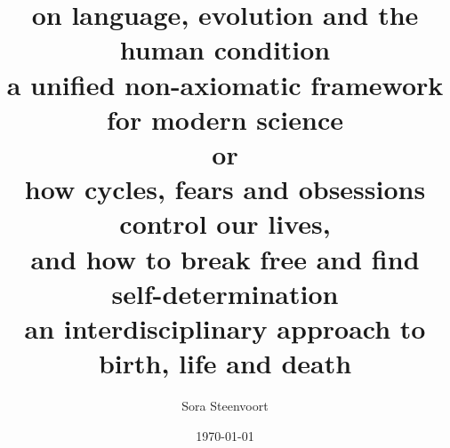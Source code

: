 \documentclass[12pt]{report}
\title{
{on language, evolution and the human condition}\\
{\large a unified non-axiomatic framework for modern science}\\
{\large\sc or}\\
{how cycles, fears and obsessions control our lives,\\and how to break free and find self-determination}\\
{\large an interdisciplinary approach to birth, life and death}
}
\author{Sora Steenvoort}
\date{\today}
\theoremstyle{definition}
\theoremstyle{remark}
\begin{document}
\newcommand*{\textTODO}[1]{\colorbox{todobg}{\color[rgb]{0,0,0}#1}}
\newcommand*{\mathTODO}[1]{\colorbox{todobg}{\color[rgb]{0,0,0}$#1$}}
\newcommand*{\TODO}[1]{\ifmmode\mathTODO{#1}\else\textTODO{#1}\fi}
\pagecolor[rgb]{0.12,0.12,0.12}
\color[HTML]{FF69B4}
\let\oldfootnote\footnote
\renewcommand{\footnote}[1]{\oldfootnote{\color[rgb]{1,1,1}#1}}

\makeatletter
\renewcommand\@makefntext[1]{%
    \parindent 1em%
    \noindent
    \color[HTML]{FF69B4}
    \hb@xt@1.8em{\hss\@makefnmark}#1}
\makeatother


\maketitle
\end{document}
